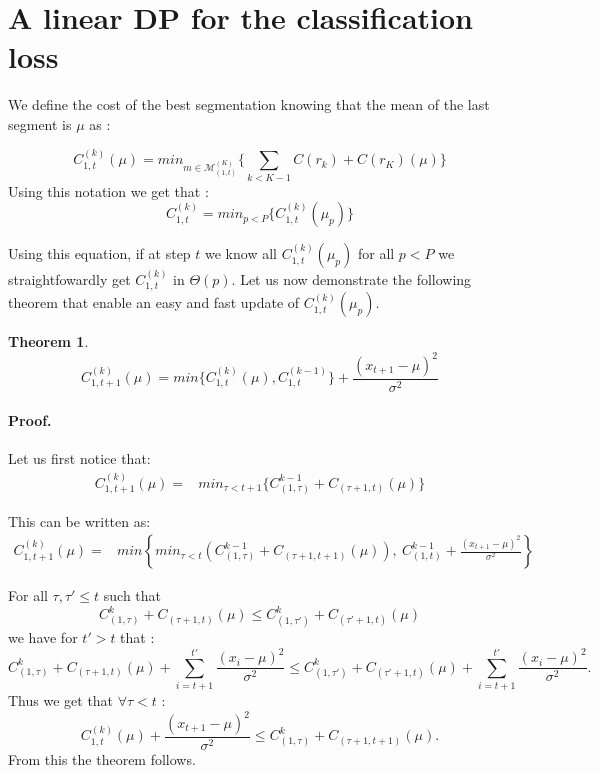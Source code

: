 \documentclass[a4paper,12pt,twoside]{report}
\newtheorem{theo}{Theorem}[section]    %
\begin{document}
\section{A linear DP for the classification loss}

We define the cost of the best segmentation knowing that the mean of the last segment is $\mu$ as :

$$ C_{1, t}^{(k)}(\mu) = min_{m \in \mathcal{M}^{(K)}_{(1, t)}} \{ \sum_{k < K-1} C(r_k)  + C(r_K)(\mu) \} $$
Using this notation we get that :
$$ C_{1, t}^{(k)}  = min_{p < P} \{ C_{1, t}^{(k)}(\mu_p) \}$$

Using this equation, if at step $t$ we know all $C_{1, t}^{(k)}(\mu_p)$ for all $p < P$ we straightfowardly get $C_{1, t}^{(k)}$ in $\Theta(p)$.
Let us now demonstrate the following theorem that enable an easy and fast update of  $C_{1, t}^{(k)}(\mu_p)$.

\begin{theo}
$$ C_{1, t+1}^{(k)}(\mu) = min \{ C_{1, t}^{(k)}(\mu),  C_{1, t}^{(k-1)} \} +   \frac{(x_{t+1} - \mu)^2 }{\sigma^2} $$
\end{theo}

\paragraph{Proof. } Let us first notice that: 
\begin{eqnarray*}
C_{1, t+1}^{(k)}(\mu) = & min_{\tau < t+1} \{ C_{(1,\tau)}^{k-1}  + C_{(\tau+1, t)}(\mu) \}
\end{eqnarray*}

This can be written as:
\begin{eqnarray*}
C_{1, t+1}^{(k)}(\mu) = & min \left\{ min_{\tau < t} \left( C_{(1,\tau)}^{k-1}  + C_{(\tau+1, t+1)}(\mu) \right), \ C_{(1,t)}^{k-1} +  \frac{(x_{t+1} - \mu)^2 }{\sigma^2}  \right\} 
\end{eqnarray*}


For all $\tau, \tau' \leq t$ such that
$$ C_{(1,\tau)}^{k}  + C_{(\tau+1, t)}(\mu) \leq C_{(1,\tau')}^{k}  + C_{(\tau'+1, t)}(\mu) $$
 we have for $t' > t$ that :
$$ C_{(1,\tau)}^{k}  + C_{(\tau+1, t)}(\mu) + \sum_{i = t+1}^{t'} \frac{(x_i - \mu)^2 }{\sigma^2} \leq C_{(1,\tau')}^{k}  + C_{(\tau'+1, t)}(\mu)  + \sum_{i = t+1}^{t'} \frac{(x_i - \mu)^2 }{\sigma^2}. $$
Thus we get that $\forall \tau < t $ : 
$$C_{1, t}^{(k)}(\mu) +  \frac{(x_{t+1} - \mu)^2  }{ \sigma^2} \leq C_{(1,\tau)}^{k} + C_{(\tau+1, t+1)}(\mu).$$
From this the theorem follows.
\end{document}

